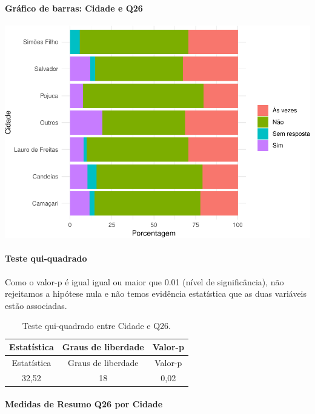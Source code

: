 \documentclass[]{article}
\let\oldparagraph\paragraph
\renewcommand{\paragraph}[1]{\oldparagraph{#1}\mbox{}}
\begin{document}
\hypertarget{gruxe1fico-de-barras-cidade-e-q26}{%
\paragraph{Gráfico de barras: Cidade e Q26}\label{gruxe1fico-de-barras-cidade-e-q26}}

\begin{center}\includegraphics[width=0.75\linewidth]{relatorio_covid19_files/figure-latex/unnamed-chunk-721-1} \end{center}

\hypertarget{teste-qui-quadrado-62}{%
\paragraph{Teste qui-quadrado}\label{teste-qui-quadrado-62}}

Como o valor-p é igual igual ou maior que 0.01 (nível de significância), não rejeitamos a hipótese nula e não temos evidência estatística que as duas variáveis estão associadas.

\begin{longtable}[]{@{}ccc@{}}
\caption{\label{tab:unnamed-chunk-723}Teste qui-quadrado entre Cidade e Q26.}\tabularnewline
\toprule
Estatística & Graus de liberdade & Valor-p\tabularnewline
\midrule
\endfirsthead
\toprule
Estatística & Graus de liberdade & Valor-p\tabularnewline
\midrule
\endhead
32,52 & 18 & 0,02\tabularnewline
\bottomrule
\end{longtable}

\cleardoublepage

\hypertarget{medidas-de-resumo-q26-por-cidade}{%
\paragraph{Medidas de Resumo Q26 por Cidade}\label{medidas-de-resumo-q26-por-cidade}}
\end{document}
